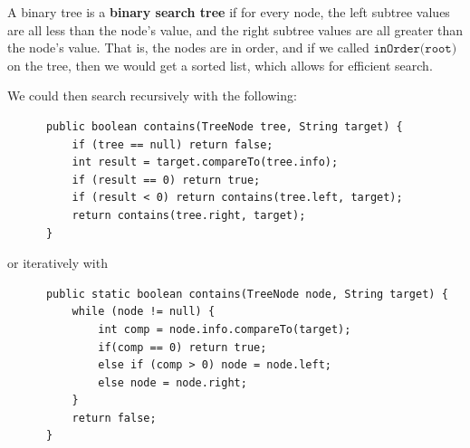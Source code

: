 \documentclass{article}
\begin{document}
      \begin{definition}
      A binary tree is a \textbf{binary search tree} if for every node, the left subtree values are all less than the node's value, and the right subtree values are all greater than the node's value. That is, the nodes are in order, and if we called $\texttt{inOrder(root)}$ on the tree, then we would get a sorted list, which allows for efficient search. 
      \end{definition}

      We could then search recursively with the following: 
      \begin{lstlisting}
      public boolean contains(TreeNode tree, String target) {
          if (tree == null) return false; 
          int result = target.compareTo(tree.info); 
          if (result == 0) return true; 
          if (result < 0) return contains(tree.left, target); 
          return contains(tree.right, target); 
      }
      \end{lstlisting}

      or iteratively with
      \begin{lstlisting}
      public static boolean contains(TreeNode node, String target) {
          while (node != null) {
              int comp = node.info.compareTo(target); 
              if(comp == 0) return true; 
              else if (comp > 0) node = node.left; 
              else node = node.right; 
          }
          return false; 
      }
      \end{lstlisting}
\end{document}
